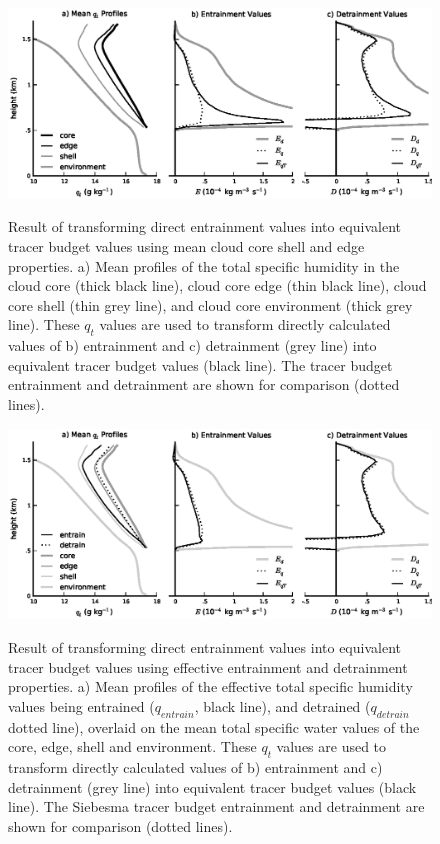 \documentclass[12pt]{article}
\begin{document}
\begin{figure}[t]
  \noindent
  \includegraphics[width=39pc,angle=0]{./figures/shell_correction}\\
  \caption{Result of transforming direct entrainment values into 
  equivalent tracer budget values using mean cloud core shell and edge 
  properties.  a) Mean profiles of the total specific humidity in the 
  cloud core (thick black line), cloud core edge (thin black line), 
  cloud core shell (thin grey line), and cloud core environment (thick 
  grey line).  These $q_t$ values are used to transform directly 
  calculated values of b) entrainment and c) detrainment (grey line) 
  into equivalent tracer budget values (black line).  The tracer budget 
  entrainment and detrainment are shown for comparison (dotted lines).}
  \label{fig:Shell_correction}
\end{figure}

\begin{figure}[t]
  \noindent
  \includegraphics[width=39pc,angle=0]{./figures/reynolds_correction}\\
  \caption{Result of transforming direct entrainment values into 
  equivalent tracer budget values using effective entrainment and 
  detrainment properties.  a) Mean profiles of the effective total 
  specific humidity values being entrained ($q_{entrain}$, black line), 
  and detrained ($q_{detrain}$ dotted line), overlaid on the mean total 
  specific water values of the core, edge, shell and environment.  These 
  $q_t$ values are used to transform directly calculated values of b) 
  entrainment and c) detrainment (grey line) into equivalent tracer 
  budget values (black line).  The Siebesma tracer budget entrainment 
  and detrainment are shown for comparison (dotted lines).}
  \label{fig:Reynolds_correction}
\end{figure}
\end{document}
